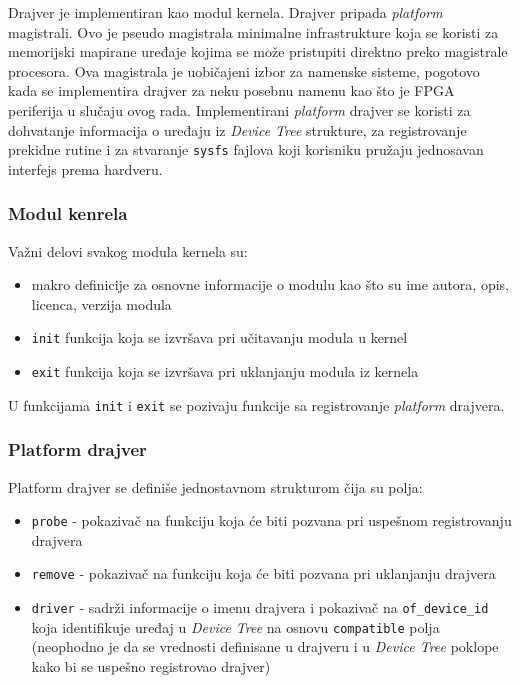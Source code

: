 Drajver je implementiran kao modul kernela. Drajver pripada \textit{platform} magistrali. Ovo je pseudo magistrala minimalne infrastrukture koja se koristi za memorijski mapirane uređaje kojima se može pristupiti direktno preko magistrale procesora. Ova magistrala je uobičajeni izbor za namenske sisteme, pogotovo kada se implementira drajver za neku posebnu namenu kao što je FPGA periferija u slučaju ovog rada. Implementirani \textit{platform} drajver se koristi za dohvatanje informacija o uređaju iz \textit{Device Tree} strukture, za registrovanje prekidne rutine i za stvaranje \texttt{sysfs} fajlova koji korisniku pružaju jednosavan interfejs prema hardveru.

\subsubsection*{Modul kenrela}
Važni delovi svakog modula kernela su:
\begin{itemize}
\item makro definicije za osnovne informacije o modulu kao što su ime autora, opis, licenca, verzija modula
\item \texttt{init} funkcija koja se izvršava pri učitavanju modula u kernel
\item \texttt{exit} funkcija koja se izvršava pri uklanjanju modula iz kernela
\end{itemize}

U funkcijama \texttt{init} i \texttt{exit} se pozivaju funkcije sa registrovanje \textit{platform} drajvera.

\subsubsection*{Platform drajver}
Platform drajver se definiše jednostavnom strukturom čija su polja:
\begin{itemize}
\item \texttt{probe} - pokazivač na funkciju koja će biti pozvana pri uspešnom registrovanju drajvera
\item \texttt{remove} - pokazivač na funkciju koja će biti pozvana pri uklanjanju drajvera
\item \texttt{driver} - sadrži informacije o imenu drajvera i pokazivač na \texttt{of\_device\_id} koja identifikuje uređaj u \textit{Device Tree} na osnovu \texttt{compatible} polja (neophodno je da se vrednosti definisane u drajveru i u \textit{Device Tree} poklope kako bi se uspešno registrovao drajver)
\end{itemize}

